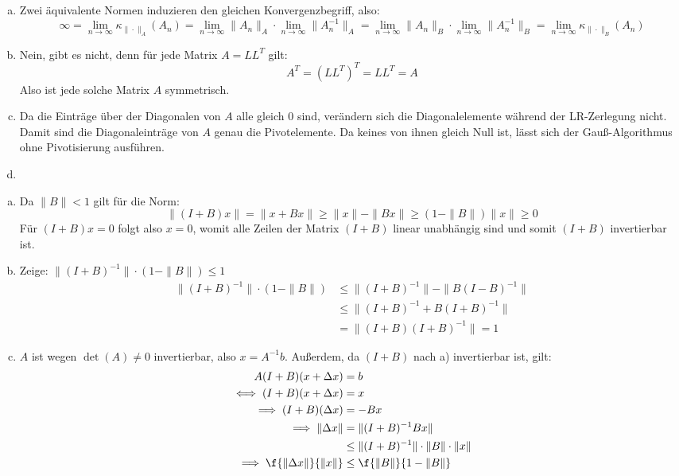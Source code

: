 \documentclass{scrartcl}
\begin{document}
\begin{aufgabe}
	\begin{enumerate}[a)]
		\item
			Zwei äquivalente Normen induzieren den gleichen Konvergenzbegriff, also:
			\[
				\infty = \lim_{n\to \infty}\kappa_{\|\cdot\|_A}(A_n) = \lim_{n\to\infty}\|A_n\|_A\cdot \lim_{n\to\infty}\|A_n^{-1}\|_A = \lim_{n\to\infty}\|A_n\|_B\cdot\lim_{n\to\infty}\|A_n^{-1}\|_B=\lim_{n\to \infty} \kappa_{\|\cdot\|_B}(A_n)
			\]
		\item
			Nein, gibt es nicht, denn für jede Matrix $A=LL^T$ gilt:
			\[
				A^T = (LL^T)^T = LL^T = A
			\]
			Also ist jede solche Matrix $A$ symmetrisch.
		\item
			Da die Einträge über der Diagonalen von $A$ alle gleich 0 sind, verändern sich die Diagonalelemente während der LR-Zerlegung nicht.
			Damit sind die Diagonaleinträge von $A$ genau die Pivotelemente.
			Da keines von ihnen gleich Null ist, lässt sich der Gauß-Algorithmus ohne Pivotisierung ausführen.
		\item ~
			\vspace{7em}
	\end{enumerate}
\end{aufgabe}

\setcounter{aufgabe}{1}
\begin{aufgabe}
	\begin{enumerate}[a)]
		\item
			Da $\|B\|<1$ gilt für die Norm:
			\[
				\|(I+B)x\| = \|x+Bx\| \ge \|x\| - \|Bx\| \ge (1-\|B\|)\|x\| \ge 0
			\]
			Für $(I+B)x=0$ folgt also $x=0$, womit alle Zeilen der Matrix $(I+B)$ linear unabhängig sind und somit $(I+B)$ invertierbar ist.
		\item
			Zeige: $\|(I+B)^{-1}\| \cdot (1-\|B\|) \le 1$
			\begin{align*}
				\|(I+B)^{-1}\| \cdot (1-\|B\|) &\le
				\|(I+B)^{-1}\|-\|B(I-B)^{-1}\| \\
				&\le \|(I+B)^{-1} + B(I+B)^{-1}\| \\
				&= \|(I+B)(I+B)^{-1}\| = 1
			\end{align*}
		\item
			$A$ ist wegen $\det(A)\neq 0$ invertierbar, also $x=A^{-1}b$.
			Außerdem, da $(I+B)$ nach a) invertierbar ist, gilt:
			\begin{align*}
				A(I+B)(x+\Delta x) &= b\\
			\iff (I+B)(x+\Delta x) &= x\\
			 \implies (I+B)(\Delta x) &= -Bx\\
				  \implies \|\Delta x \| & =\|(I+B)^{-1}Bx\|\\
																	   &\le \|(I+B)^{-1}\|\cdot\|B\|\cdot\|x\|\\
				\implies \f{\|\Delta x\|}{\|x\|} &\le \f{\|B\|}{1-\|B\|}
			\end{align*}
	\end{enumerate}

\end{aufgabe}
\end{document}
